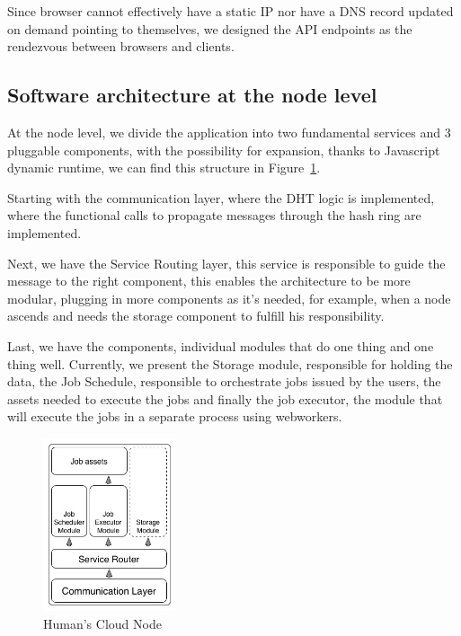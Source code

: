 Since browser cannot effectively have a static IP nor have a DNS record updated on demand pointing to themselves, we designed the API endpoints as the rendezvous between browsers and clients.

\subsection{Software architecture at the node level}

At the node level, we divide the application into two fundamental services and 3 pluggable components, with the possibility for expansion, thanks to Javascript dynamic runtime, we can find this structure in Figure~\ref{fig:hcnode}.

Starting with the communication layer, where the DHT logic is implemented, where the functional calls to propagate messages through the hash ring are implemented. 

Next, we have the Service Routing layer, this service is responsible to guide the message to the right component, this enables the architecture to be more modular, plugging in more components as it's needed, for example, when a node ascends and needs the storage component to fulfill his responsibility.

Last, we have the components, individual modules that do one thing and one thing well. Currently, we present the Storage module, responsible for holding the data, the Job Schedule, responsible to orchestrate jobs issued by the users, the assets needed to execute the jobs and finally the job executor, the module that will execute the jobs in a separate process using webworkers.


\begin{figure}[h!]
  \centering
  \includegraphics[width=0.35\textwidth]{img/node.jpg}
  \caption{Human's Cloud Node}
  \label{fig:hcnode}
\end{figure}

